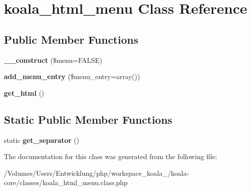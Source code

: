 \hypertarget{classkoala__html__menu}{
\section{koala\_\-html\_\-menu Class Reference}
\label{classkoala__html__menu}
}
\subsection*{Public Member Functions}
\begin{DoxyCompactItemize}
\item 
\hypertarget{classkoala__html__menu_a8f7f0b8fddd8e8d8ab2a9dc23047f2df}{
{\bfseries \_\-\_\-construct} (\$menu=FALSE)}
\label{classkoala__html__menu_a8f7f0b8fddd8e8d8ab2a9dc23047f2df}

\item 
\hypertarget{classkoala__html__menu_a78be7a875957f77a9029b2c4b1b51bb1}{
{\bfseries add\_\-menu\_\-entry} (\$menu\_\-entry=array())}
\label{classkoala__html__menu_a78be7a875957f77a9029b2c4b1b51bb1}

\item 
\hypertarget{classkoala__html__menu_a3be0369206cf5104b0b650831100c121}{
{\bfseries get\_\-html} ()}
\label{classkoala__html__menu_a3be0369206cf5104b0b650831100c121}

\end{DoxyCompactItemize}
\subsection*{Static Public Member Functions}
\begin{DoxyCompactItemize}
\item 
\hypertarget{classkoala__html__menu_abc58bc6011200beed7a85eb1b26406a4}{
static {\bfseries get\_\-separator} ()}
\label{classkoala__html__menu_abc58bc6011200beed7a85eb1b26406a4}

\end{DoxyCompactItemize}


The documentation for this class was generated from the following file:\begin{DoxyCompactItemize}
\item 
/Volumes/Users/Entwicklung/php/workspace\_\-koala\_/koala-\/core/classes/koala\_\-html\_\-menu.class.php\end{DoxyCompactItemize}
